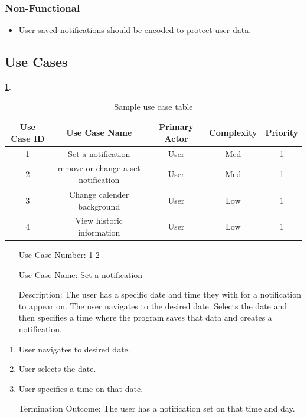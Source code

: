 \documentclass[10pt,conference,onecolumn,compsoc]{IEEEtran}
\begin{document}
\subsubsection{Non-Functional}
\begin{itemize}
\item User saved notifications should be encoded to protect user data.
\end{itemize}

\subsection{Use Cases}

\ref{tab:useCaseIndex}.




\begin{table}
\centering
\begin{tabular}{|c|c|c|c|c|}
\hline
Use Case ID & Use Case Name & Primary Actor & Complexity & Priority \\
\hline \hline
1 & Set a notification & User & Med & 1\\
\hline
\hline
2 & remove or change a set notification & User & Med & 1\\
\hline
3 & Change calender background & User & Low & 1\\
\hline
\hline
4 & View historic information & User & Low & 1\\
\hline

\end{tabular}
\caption{Sample use case table}
\label{tab:useCaseIndex}
\end{table}


\begin{itemize}
\item[Use Case Number:] 1-2
\item[Use Case Name:] Set a notification
\item[Description:] The user has a specific date and time they with for a notification to appear on. The user navigates to the desired date. Selects the date and then specifies a time where the program saves that data and creates a notification.
\end{itemize}

\begin{enumerate}
\item User navigates to desired date.
\item User selects the date.
\item User specifies a time on that date.
\item[Termination Outcome:] The user has a notification set on that time and day.
\end{enumerate}
\end{document}
